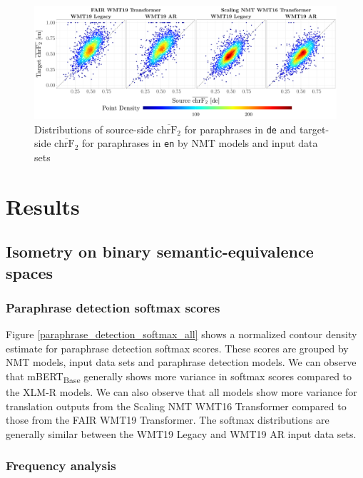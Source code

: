 \documentclass[11pt,a4paper]{article}
\begin{document}
\begin{figure}
  \centering 
  \includegraphics[trim={0cm 0cm 0cm 0cm},clip,width=\textwidth]{chrf_nmt.pdf}
  \caption{Distributions of source-side $\overline{\text{chrF}_2}$ for paraphrases in \texttt{de} and target-side $\overline{\text{chrF}_2}$ for paraphrases in \texttt{en} by NMT models and input data sets}
  \label{chrf_distribution}
\end{figure}

\section{Results}

\subsection{Isometry on binary semantic-equivalence spaces}

\subsubsection{Paraphrase detection softmax scores}

Figure \ref{paraphrase_detection_softmax_all} shows a normalized contour density estimate for paraphrase detection softmax scores. These scores are grouped by NMT models, input data sets and paraphrase detection models. We can observe that mBERT\textsubscript{Base} generally shows more variance in softmax scores compared to the XLM-R models. We can also observe that all models show more variance for translation outputs from the Scaling NMT WMT16 Transformer compared to those from the FAIR WMT19 Transformer. The softmax distributions are generally similar between the WMT19 Legacy and WMT19 AR input data sets.

\subsubsection{Frequency analysis}
\end{document}
